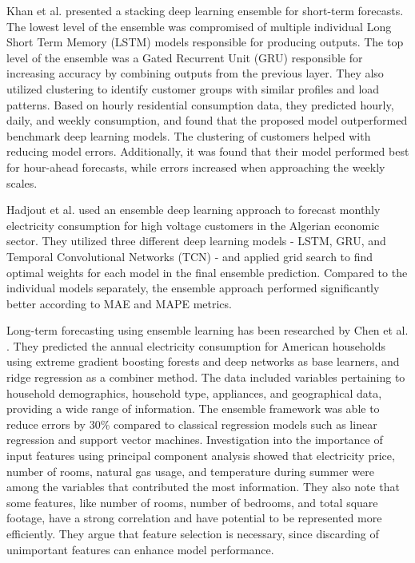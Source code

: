 Khan et al. \cite{khan_ensemble_2021} presented a stacking deep learning ensemble for short-term forecasts. The lowest level of the ensemble was compromised of multiple individual Long Short Term Memory (LSTM) models responsible for producing outputs. The top level of the ensemble was a Gated Recurrent Unit (GRU) responsible for increasing accuracy by combining outputs from the previous layer. They also utilized clustering to identify customer groups with similar profiles and load patterns. Based on hourly residential consumption data, they predicted hourly, daily, and weekly consumption, and found that the proposed model outperformed benchmark deep learning models. The clustering of customers helped with reducing model errors. Additionally, it was found that their model performed best for hour-ahead forecasts, while errors increased when approaching the weekly scales.

Hadjout et al. \cite{hadjout_electricity_2022} used an ensemble deep learning approach to forecast monthly electricity consumption for high voltage customers in the Algerian economic sector. They utilized three different deep learning models \hyp{} LSTM, GRU, and Temporal Convolutional Networks (TCN) \hyp{} and applied grid search to find optimal weights for each model in the final ensemble prediction. Compared to the individual models separately, the ensemble approach performed significantly better according to MAE and MAPE metrics.

Long-term forecasting using ensemble learning has been researched by Chen et al. \cite{chen_novel_2018}. They predicted the annual electricity consumption for American households using extreme gradient boosting forests and deep networks as base learners, and ridge regression as a combiner method. The data included variables pertaining to household demographics, household type, appliances, and geographical data, providing a wide range of information. The ensemble framework was able to reduce errors by 30\% compared to classical regression models such as linear regression and support vector machines. Investigation into the importance of input features using principal component analysis showed that electricity price, number of rooms, natural gas usage, and temperature during summer were among the variables that contributed the most information. They also note that some features, like number of rooms, number of bedrooms, and total square footage, have a strong correlation and have potential to be represented more efficiently. They argue that feature selection is necessary, since discarding of unimportant features can enhance model performance.

